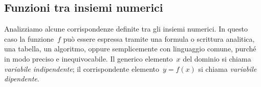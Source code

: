 \begin{center}
 
\end{center}

\subsection{Funzioni tra insiemi numerici}
\label{subsec:fun_numeriche}

Analizziamo alcune corrispondenze definite tra gli insiemi numerici. In
questo caso la funzione~$f$ può essere espressa
tramite una formula o scrittura analitica, una tabella, un algoritmo,
oppure semplicemente con linguaggio comune, purché in modo preciso e
inequivocabile. Il generico elemento~$x$ del dominio si chiama
\emph{variabile indipendente}; il corrispondente elemento~$y =f(x)$ si chiama 
\emph{variabile dipendente}.

